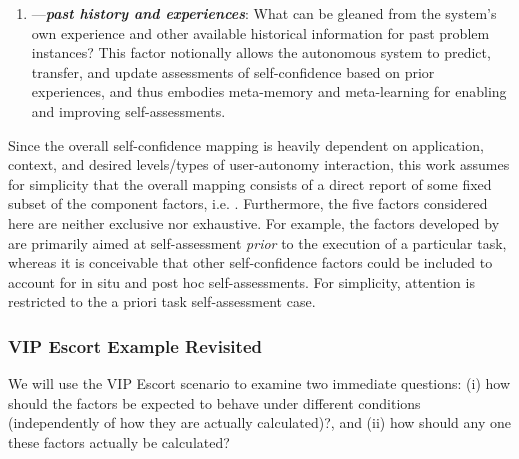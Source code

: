 \begin{enumerate}
%
\item \xP---\textit{\textbf{past history and experiences}}: What can be gleaned from the system's own experience and other available historical information for past problem instances?  
This factor notionally allows the autonomous system to predict, transfer, and update assessments of self-confidence based on prior experiences, and thus embodies meta-memory and meta-learning for enabling and improving self-assessments. 
\end{enumerate}

Since the overall self-confidence mapping is heavily dependent on application, context, and desired levels/types of user-autonomy interaction, this work assumes for simplicity that the overall mapping consists of a direct report of some fixed subset of the component factors, i.e. \xSC. 
Furthermore, the five factors considered here are neither exclusive nor exhaustive. For example, the factors developed by \cite{Aitken2016-cv,Aitken2016-fb} are primarily aimed at self-assessment \emph{prior} to the execution of a particular task, whereas it is conceivable that other self-confidence factors could be included to account for in situ and post hoc self-assessments. For simplicity, attention is restricted to the a priori task self-assessment case. %


\subsubsection{VIP Escort Example Revisited}

We will use the VIP Escort scenario to examine two immediate questions: (i) how should the factors be expected to behave under different conditions (independently of how they are actually calculated)?, and (ii) how should any one these factors actually be calculated?  

